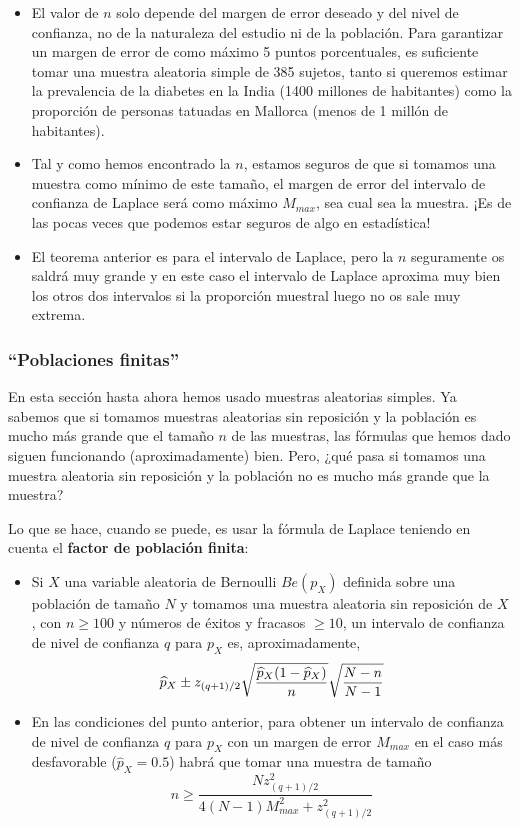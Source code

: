 \documentclass[
  spanish,
  letterpaper,
  DIV=11,
  numbers=noendperiod]{scrreprt}
\begin{document}
\begin{itemize}
\item
  El valor de \(n\) solo depende del margen de error deseado y del nivel
  de confianza, no de la naturaleza del estudio ni de la población. Para
  garantizar un margen de error de como máximo 5 puntos porcentuales, es
  suficiente tomar una muestra aleatoria simple de 385 sujetos, tanto si
  queremos estimar la prevalencia de la diabetes en la India (1400
  millones de habitantes) como la proporción de personas tatuadas en
  Mallorca (menos de 1 millón de habitantes).
\item
  Tal y como hemos encontrado la \(n\), estamos seguros de que si
  tomamos una muestra como mínimo de este tamaño, el margen de error del
  intervalo de confianza de Laplace será como máximo \(M_{max}\), sea
  cual sea la muestra. ¡Es de las pocas veces que podemos estar seguros
  de algo en estadística!
\item
  El teorema anterior es para el intervalo de Laplace, pero la \(n\)
  seguramente os saldrá muy grande y en este caso el intervalo de
  Laplace aproxima muy bien los otros dos intervalos si la proporción
  muestral luego no os sale muy extrema.
\end{itemize}

\subsubsection{``Poblaciones finitas''}\label{poblaciones-finitas}

En esta sección hasta ahora hemos usado muestras aleatorias simples. Ya
sabemos que si tomamos muestras aleatorias sin reposición y la población
es mucho más grande que el tamaño \(n\) de las muestras, las fórmulas
que hemos dado siguen funcionando (aproximadamente) bien. Pero, ¿qué
pasa si tomamos una muestra aleatoria sin reposición y la población no
es mucho más grande que la muestra?

Lo que se hace, cuando se puede, es usar la fórmula de Laplace teniendo
en cuenta el \textbf{factor de población finita}:

\begin{itemize}
\item
  Si \(X\) una variable aleatoria de Bernoulli \(Be(p_X)\) definida
  sobre una población de tamaño \(N\) y tomamos una muestra aleatoria
  sin reposición de \(X\), con \(n\geqslant 100\) y números de éxitos y
  fracasos \(\geqslant 10\), un intervalo de confianza de nivel de
  confianza \(q\) para \(p_X\) es, aproximadamente, \[
  \widehat{p}_{X}\pm z_{(q+1)/2}\sqrt{\frac{\widehat{p}_{X}
  (1-\widehat{p}_{X})}{n}}\sqrt{\frac{\vphantom{(}N-n}{N-1}}
  \]
\item
  En las condiciones del punto anterior, para obtener un intervalo de
  confianza de nivel de confianza \(q\) para \(p_X\) con un margen de
  error \(M_{max}\) en el caso más desfavorable (\(\widehat{p}_X=0.5\))
  habrá que tomar una muestra de tamaño \[
  n\geqslant \frac{Nz_{(q+1)/2}^2}{4(N-1)M_{max}^2+z_{(q+1)/2}^2}
  \]
\end{itemize}
\end{document}
